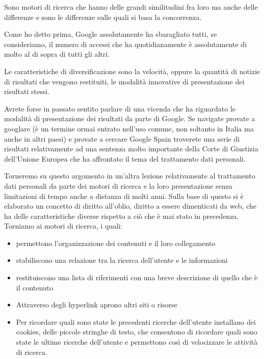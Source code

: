      Sono motori di ricerca che hanno delle grandi similitudini fra loro ma anche delle differenze e sono le differenze sulle quali si basa la concorrenza. \par
     Come ho detto prima, Google assolutamente ha sbaragliato tutti, se consideriamo, il numero di accessi che ha quotidianamente è assolutamente di molto al di sopra di tutti gli altri.\par
     Le caratteristiche di diversificazione sono la velocità, oppure la quantità di notizie di risultati che vengono restituiti, le modalità innovative di presentazione dei risultati stessi.\par
     Avrete forse in passato sentito parlare di una vicenda che ha riguardato le modalità di presentazione dei risultati da parte di Google. Se navigate provate a googlare (è un termine ormai entrato nell'uso comune, non soltanto in Italia ma anche in altri paesi) e provate a cercare Google Spain troverete una serie di risultati relativamente ad una sentenza molto importante della Corte di Giustizia dell'Unione Europea che ha affrontato il tema del trattamento dati personali.\par
     Torneremo su questo argomento in un'altra lezione relativamente al trattamento dati personali da parte dei motori di ricerca e la loro presentazione senza limitazioni di tempo anche a distanza di molti anni. Sulla base di questo si è elaborato un concetto di diritto all'oblio, diritto a essere dimenticati da web, che ha delle caratteristiche diverse rispetto a ciò che è mai stato in precedenza. 
     Torniamo ai motori di ricerca, i quali:

\begin{itemize}
    \item permettono l'organizzazione dei contenuti e il loro collegamento 
    \item stabiliscono una relazione tra la ricerca dell'utente e le informazioni 
    \item restituiscono una lista di riferimenti con una breve descrizione di quello che è il contenuto
    \item Attraverso degli hyperlink aprono altri siti o risorse
    \item Per ricordare quali sono state le precedenti ricerche dell'utente installano dei cookies, delle piccole stringhe di testo, che consentono di ricordare quali sono state le ultime ricerche dell'utente e permettono così di velocizzare le attività di ricerca.
\end{itemize}
     
